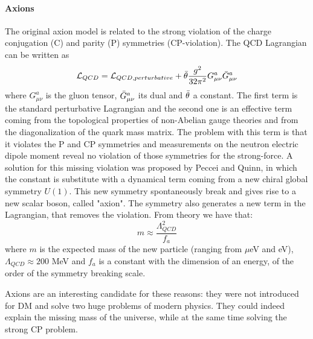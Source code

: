 \paragraph{Axions} The original axion model is related to the strong violation of the charge conjugation (C) and parity (P) symmetries (CP-violation). The QCD Lagrangian can be written as 
\begin{equation}
    \mathcal L _{QCD} = \mathcal L _{QCD, perturbative} + \Bar{\theta} \frac{g^2}{32 \pi^2} G^a_{\mu \nu} \Bar{G}^a_{\mu \nu}
\end{equation}
where $G^a_{\mu \nu}$ is the gluon tensor, $\Bar{G}^a_{\mu \nu}$ its dual and $\Bar{\theta}$ a constant. The first term is the standard perturbative Lagrangian and the second one is an effective term coming from the topological properties of non-Abelian gauge theories and from the diagonalization of the quark mass matrix.
The problem with this term is that it violates the P and CP symmetries and measurements on the neutron electric dipole moment reveal no violation of those symmetries for the strong-force. 
A solution for this missing violation was proposed by Peccei and Quinn, in which the constant is substitute with a dynamical term coming from a new chiral global symmetry $U(1)$. This new symmetry spontaneously break and gives rise to a new scalar boson, called "axion". The symmetry also generates a new term in the Lagrangian, that removes the violation. From theory we have that:
\begin{equation}
    m \approx \frac{\Lambda^2_{QCD}}{f_a}
\end{equation}
where $m$ is the expected mass of the new particle (ranging from $\mu$eV and eV), $\Lambda_{QCD}\approx 200$ MeV and $f_a$ is a constant with the dimension of an energy, of the order of the symmetry breaking scale.

Axions are an interesting candidate for these reasons: they were not introduced for DM and solve two huge problems of modern physics. They could indeed explain the missing mass of the universe, while at the same time solving the strong CP problem.

